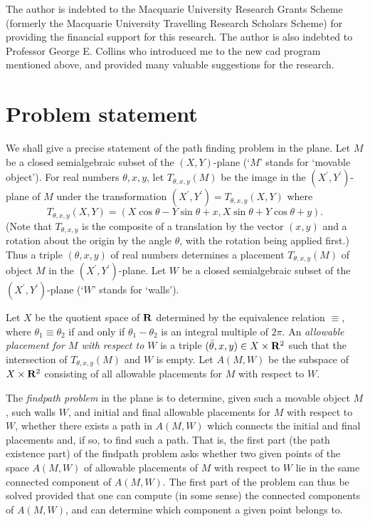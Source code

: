 The author is indebted to the Macquarie University 
Research Grants Scheme (formerly the Macquarie University Travelling
Research Scholars Scheme) for providing the financial support for
this research. The author is also indebted to Professor George E.
Collins who introduced me to the new cad program mentioned above,
and provided many valuable suggestions for the research.

\section{Problem statement}
We shall give a precise statement of the path finding problem
in the plane. Let $M$ be a closed semialgebraic subset of the $(X,Y)$-plane
(`$M$' stands for `movable object').
For real numbers $\theta , x,y$, let $T_{\theta ,x,y}(M)$ be the
image in the $(X^{\prime}, Y^{\prime})$-plane of $M$ under the
transformation $(X^{\prime}, Y^{\prime}) = T_{\theta ,x,y}(X,Y)$ where
\[T_{\theta ,x,y}(X,Y) = (X \cos \theta - Y \sin \theta + x,
                         X \sin \theta + Y \cos \theta + y).\]
(Note that $T_{\theta ,x,y}$ is the composite of a translation
by the vector $(x,y)$ and a rotation about the origin by the
angle $\theta$, with the rotation being applied first.)
Thus a triple $(\theta ,x,y)$
of real numbers determines a placement $T_{\theta ,x,y}(M)$ of object $M$
in the $(X^{\prime}, Y^{\prime})$-plane.
Let $W$ be a closed semialgebraic subset of the $(X^{\prime},Y^{\prime})$-plane
(`$W$' stands for `walls').

Let $X$ be the quotient space of ${\bf R}$ determined by the
equivalence relation $\equiv$, where
$\theta _{1} \equiv \theta _{2}$ if and only if $\theta _{1} - \theta _{2}$
is an integral multiple of $2\pi$.
An {\em allowable placement for $M$ with respect to $W$} is
a triple $(\bar{\theta} ,x,y) \in X \times {\bf R}^{2}$ such that
the intersection of $T_{\theta ,x,y}(M)$ and $W$ is empty.
Let $A(M,W)$ be the subspace of $X \times {\bf R}^{2}$ consisting of all
allowable placements for $M$ with respect to $W$.

The {\em findpath problem} in the plane
is to determine, given such a movable object $M$, such walls $W$, and
initial and final allowable placements for $M$
with respect to $W$, whether there exists a path in $A(M,W)$ which
connects the initial and final placements and, if so, to
find such a path. That is, the first part (the path existence part)
of the findpath problem
asks whether two given points of the space $A(M,W)$
of allowable placements of $M$ with respect to $W$ lie in the
same connected component of $A(M,W)$. The first part of the problem 
can thus 
be solved provided that one can compute (in some sense) the connected
components of $A(M,W)$, and can determine which component a given
point belongs to.


